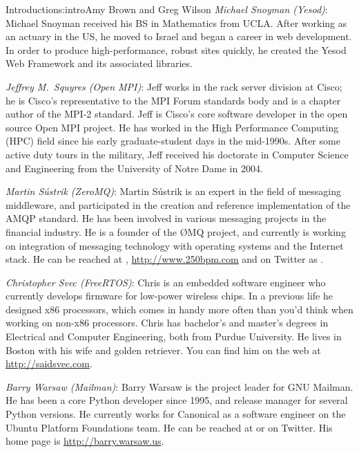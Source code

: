 \begin{aosachapter}{Introduction}{s:intro}{Amy Brown and Greg Wilson}
\emph{Michael Snoyman (Yesod)}: Michael Snoyman received his BS in Mathematics
from UCLA. After working as an actuary in the US, he moved to Israel and began
a career in web development. In order to produce high-performance, robust sites
quickly, he created the Yesod Web Framework and its associated libraries.

\emph{Jeffrey M.\ Squyres (Open MPI)}: Jeff works in the rack server
division at Cisco; he is Cisco's representative to the MPI Forum
standards body and is a chapter author of the MPI-2 standard.  Jeff is
Cisco's core software developer in the open source Open MPI project.
He has worked in the High Performance Computing (HPC) field since his
early graduate-student days in the mid-1990s.  After some active duty
tours in the military, Jeff received his doctorate in Computer Science
and Engineering from the University of Notre Dame in 2004.

\emph{Martin S\'{u}strik (ZeroMQ)}: Martin S\'{u}strik is an expert in the field of
messaging middleware, and participated in the creation and reference
implementation of the AMQP standard. He has been involved in various
messaging projects in the financial industry. He is a founder of the {\O}MQ
project, and currently is working on integration of messaging technology with
operating systems and the Internet stack. He can be reached at
, \url{http://www.250bpm.com} and on Twitter as
.

\emph{Christopher Svec (FreeRTOS)}: Chris is an embedded software
engineer who currently develops firmware for low-power wireless chips.
In a previous life he designed x86 processors, which comes in handy
more often than you'd think when working on non-x86 processors.
Chris has bachelor's and master's degrees in Electrical
and Computer Engineering, both from Purdue University.
He lives in Boston with his wife and golden retriever. You can find
him on the web at \url{http://saidsvec.com}.

\emph{Barry Warsaw (Mailman)}: Barry Warsaw is the project leader for GNU
Mailman.  He has been a core Python developer since 1995, and release manager
for several Python versions. He 
\linebreak currently works for Canonical as a software
engineer on the Ubuntu Platform Foundations 
\linebreak team.  He can be reached at
 or  on Twitter.  His home page is
\linebreak \url{http://barry.warsaw.us}.


\end{aosachapter}
